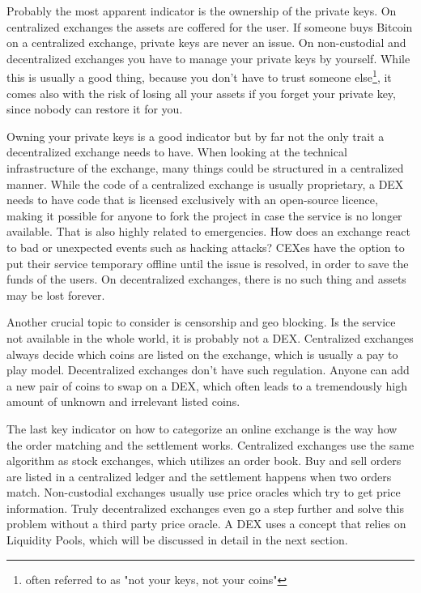 Probably the most apparent indicator is the ownership of the private keys. On centralized exchanges the assets are coffered for the user. If someone buys Bitcoin on a centralized exchange, private keys are never an issue. On non-custodial and decentralized exchanges you have to manage your private keys by yourself. While this is usually a good thing, because you don't have to trust someone else\footnote{often referred to as "not your keys, not your coins"}, it comes also with the risk of losing all your assets if you forget your private key, since nobody can restore it for you.

Owning your private keys is a good indicator but by far not the only trait a decentralized exchange needs to have. When looking at the technical infrastructure of the exchange, many things could be structured in a centralized manner. While the code of a centralized exchange is usually proprietary, a DEX needs to have code that is licensed exclusively with an open-source licence, making it possible for anyone to fork the project in case the service is no longer available. That is also highly related to emergencies. How does an exchange react to bad or unexpected events such as hacking attacks? CEXes have the option to put their service temporary offline until the issue is resolved, in order to save the funds of the users. On decentralized exchanges, there is no such thing and assets may be lost forever.

Another crucial topic to consider is censorship and geo blocking. Is the service not available in the whole world, it is probably not a DEX. Centralized exchanges always decide which coins are listed on the exchange, which is usually a pay to play model. Decentralized exchanges don't have such regulation. Anyone can add a new pair of coins to swap on a DEX, which often leads to a tremendously high amount of unknown and irrelevant listed coins.

The last key indicator on how to categorize an online exchange is the way how the order matching and the settlement works. Centralized exchanges use the same algorithm as stock exchanges, which utilizes an order book. Buy and sell orders are listed in a centralized ledger and the settlement happens when two orders match. Non-custodial exchanges usually use price oracles which try to get price information. Truly decentralized exchanges even go a step further and solve this problem without a third party price oracle. A DEX uses a concept that relies on Liquidity Pools, which will be discussed in detail in the next section.

